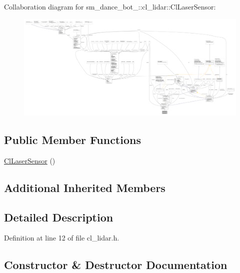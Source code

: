 Collaboration diagram for sm\+\_\+dance\+\_\+bot\+\_\+:\+:cl\+\_\+lidar\+:\+:Cl\+Laser\+Sensor\+:
\nopagebreak
\begin{figure}[H]
\begin{center}
\leavevmode
\includegraphics[width=350pt]{classsm__dance__bot__3_1_1cl__lidar_1_1ClLaserSensor__coll__graph}
\end{center}
\end{figure}
\subsection*{Public Member Functions}
\begin{DoxyCompactItemize}
\item 
\hyperlink{classsm__dance__bot__3_1_1cl__lidar_1_1ClLaserSensor_abc1bb55e3fd232edc5571864d06761fd}{Cl\+Laser\+Sensor} ()
\end{DoxyCompactItemize}
\subsection*{Additional Inherited Members}


\subsection{Detailed Description}


Definition at line 12 of file cl\+\_\+lidar.\+h.



\subsection{Constructor \& Destructor Documentation}
